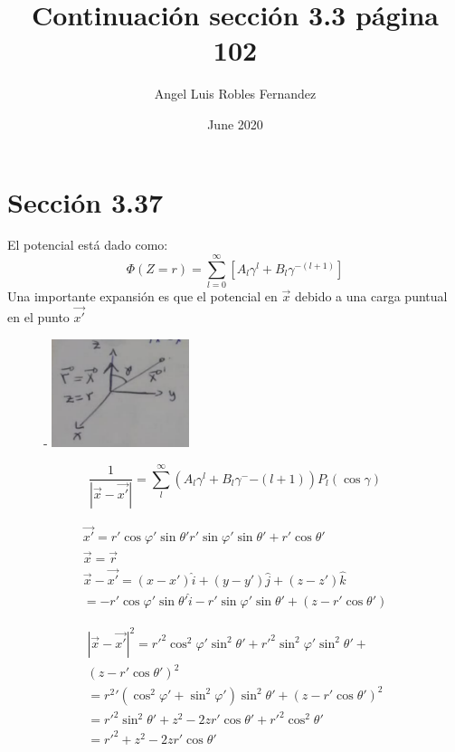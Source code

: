 \documentclass{article}
\title{Continuación sección 3.3 página 102}
\author{Angel Luis Robles Fernandez}
\date{June 2020}
\begin{document}
\maketitle

\section{Sección 3.37}
El potencial está dado como:
\begin{equation}
    \Phi(Z = r) = \sum_{l = 0}^{\infty} [A_l \gamma^l + B_l \gamma^{-(l+1)}]
\end{equation}
Una importante expansión es que el potencial en $\vec{x}$ debido a una carga puntual en el punto $\vec{x \prime}$

\begin{figure}[h]-
\includegraphics[width=4cm]{image1.png}
\centering
\end{figure}


\begin{equation}
    \frac{1}{|\vec{x} - \vec{x \prime} |} = \sum_{l}^{\infty}  (A_l \gamma^l + B_l \gamma^-{-(l+1)})P_l(\cos \gamma)  
\end{equation}

\begin{equation}
\begin{gathered}
    \vec{x\prime} =  r\prime \cos \varphi \prime \sin \theta \prime r\prime \sin \varphi \prime \sin \theta\prime + r\prime \cos \theta \prime \\
    \vec{x} = \vec{r} \\
    \vec{x} - \vec{x \prime} = (x - x\prime)\hat{i} + (y - y\prime) \hat{j} + (z-z\prime)\hat{k} \\
    = -r\prime \cos \varphi \prime \sin \theta\prime \hat{i} - r\prime \sin \varphi \prime \sin \theta \prime + (z - r\prime \cos \theta \prime)
\end{gathered}
\end{equation}

\begin{equation}
    \begin{gathered}
        |\vec{x} - \vec{x\prime}| ^2 = r \prime ^2 \cos ^2 \varphi \prime \sin ^2\theta \prime + r\prime ^2 \sin ^2 \varphi \prime \sin ^2 \theta\prime + \\ 
    (z -r \prime \cos \theta \prime)^{2} \\
    = r^2\prime (\cos^2 \varphi \prime + \sin^2\varphi \prime) \sin ^2 \theta \prime + (z - r\prime \cos \theta \prime)^2 \\
    = r \prime ^2 \sin ^2 \theta \prime + z^2 - 2zr\prime \cos \theta \prime + r \prime ^2 \cos ^2 \theta \prime \\
    = r\prime ^2 + z^2 - 2 z r \prime \cos \theta \prime
        \end{gathered}
\end{equation}
\end{document}
